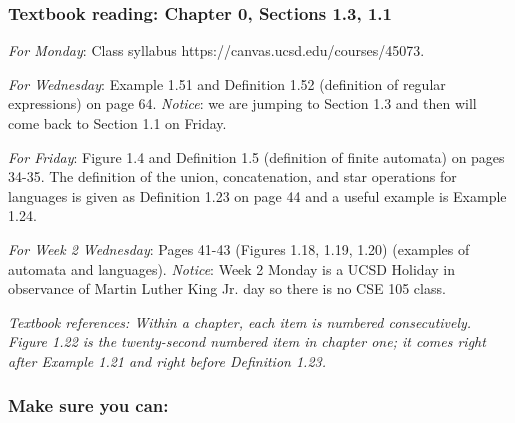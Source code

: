 \subsubsection*{Textbook reading: Chapter 0, Sections 1.3, 1.1}

{\it For Monday}: Class syllabus https://canvas.ucsd.edu/courses/45073.

{\it For Wednesday}: Example 1.51 and Definition 1.52 (definition of regular expressions) on page 64.
{\it Notice}: we are jumping to Section 1.3 and then will come back 
to Section 1.1 on Friday.

{\it For Friday}: Figure 1.4 and Definition 1.5 (definition of finite automata) on pages 34-35.
The definition of the union, concatenation, and star operations for languages is given 
as Definition 1.23 on page 44 and a useful example is Example 1.24.

{\it For Week 2 Wednesday}: Pages 41-43 (Figures 1.18, 1.19, 1.20) (examples of automata and languages).
{\it Notice}: Week 2 Monday is a UCSD Holiday in observance of Martin Luther King Jr. day so there 
is no CSE 105 class.

{\it Textbook references: Within a chapter, each item is numbered consecutively. Figure 1.22
is the twenty-second numbered item in chapter one; it comes right after Example 1.21 and right before Definition 1.23.}


\subsubsection*{Make sure you can:}


